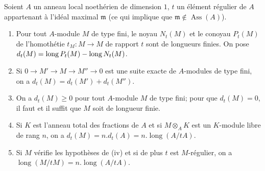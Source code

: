 \begin{lemma}[21.10.13]
\label{IV.21.10.13}
Soient $A$ un anneau local noethérien de dimension $1$, $t$ un élément régulier de $A$ appartenant à l'idéal maximal $\mathfrak{m}$ (ce qui implique que $\mathfrak{m}\notin\operatorname{Ass}(A)$).
\begin{enumerate}[label=\textup{(\roman*)}]
  \item Pour tout $A$-module $M$ de type fini, le noyau $N_t(M)$ et le conoyau $P_t(M)$ de l'homothétie $t_M:M\to M$ de rapport $t$ sont de longueurs finies. On pose $d_t(M)=\operatorname{long}P_t(M)-\operatorname{long}N_t(M)$.
  \item Si $0\to M'\to M\to M''\to0$ est une suite exacte de $A$-modules de type fini, on a $d_t(M)=d_t(M')+d_t(M'')$.
  \item On a $d_t(M)\geq0$ pour tout $A$-module $M$ de type fini; pour que $d_t(M)=0$, il faut et il suffit que $M$ soit de longueur finie.
  \item Si $K$ est l'anneau total des fractions de $A$ et si $M\otimes_AK$ est un $K$-module libre de rang $n$, on a $d_t(M)=n.d_t(A)=n.\operatorname{long}(A/tA)$.
  \item Si $M$ vérifie les hypothèses de \textup{(iv)} et si de plus $t$ est $M$-régulier, on a $\operatorname{long}(M/tM)=n.\operatorname{long}(A/tA)$.
\end{enumerate}
\end{lemma}

